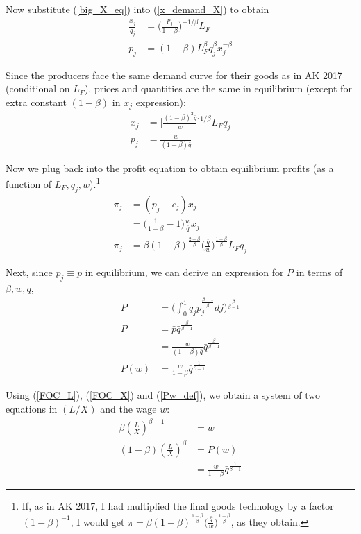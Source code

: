 \documentclass[12pt,english]{article}
\theoremstyle{remark}
\begin{document}
Now substitute (\ref{big_X_eq}) into (\ref{x_demand_X}) to obtain 
\begin{align}
\frac{x_j}{q_j} &= \Big(\frac{p_j}{1-\beta}\Big)^{-1/\beta} L_F  \nonumber \\
p_j &= (1-\beta) L_F^{\beta} q_j^{\beta} x_j^{-\beta}
\end{align}

Since the producers face the same demand curve for their goods as in AK 2017 (conditional on $L_F$), prices and quantities are the same  in equilibrium (except for extra constant $(1-\beta)$ in $x_j$ expression):
\begin{align}
x_j &= \Big[ \frac{(1-\beta)^2 \overline{q}}{w}\Big]^{1/\beta} L_F q_j \label{x_demand_LF} \\
p_j &= \frac{w}{(1-\beta)\overline{q}} \label{pj_eq}
\end{align}

Now we plug back into the profit equation to obtain equilibrium profits (as a function of $L_F, q_j,w$).\footnote{If, as in AK 2017, I had multiplied the final goods technology by a factor $(1-\beta)^{-1}$, I would get $\pi = \beta (1-\beta)^{\frac{1-\beta}{\beta}}\Big(\frac{\bar{q}}{w}\Big)^{\frac{1-\beta}{\beta}}$, as they obtain.} 
\begin{align}
\pi_j &= (p_j - c_j) x_j \nonumber \\
      &= \Big(\frac{1}{1-\beta} - 1\Big)\frac{w}{\overline{q}} x_j \nonumber \\
\pi_j &= \beta (1-\beta)^{\frac{2-\beta}{\beta}} \Big( \frac{\overline{q}}{w}  \Big)^{\frac{1-\beta}{\beta}} L_Fq_j\label{pi_eq_L} 
\end{align}

Next, since $p_j \equiv \bar{p}$ in equilibrium, we can derive an expression for $P$ in terms of $\beta,w,\bar{q}$,
\begin{align}
P &= \Big(\int_0^1 q_j p_j^{\frac{\beta-1}{\beta}} dj \Big)^{\frac{\beta}{\beta-1}} \nonumber \\
P &= \bar{p} \bar{q}^{\frac{\beta}{\beta-1}} \nonumber \\
  &= \frac{w}{(1-\beta)\bar{q}}\bar{q}^{\frac{\beta}{\beta-1}} \nonumber \\
P(w)  &= \frac{w}{1-\beta}\bar{q}^{\frac{1}{\beta-1}} \label{Pw_def}
\end{align}

Using (\ref{FOC_L}), (\ref{FOC_X}) and (\ref{Pw_def}), we obtain a system of two equations in $(L/X)$ and the wage $w$:
\begin{align*}
	\beta (\frac{L}{X})^{\beta -1} &= w \\
	(1-\beta) (\frac{L}{X})^{\beta} &= P(w) \\
									&= \frac{w}{1-\beta}\bar{q}^{\frac{1}{\beta -1}}
\end{align*}
\end{document}
